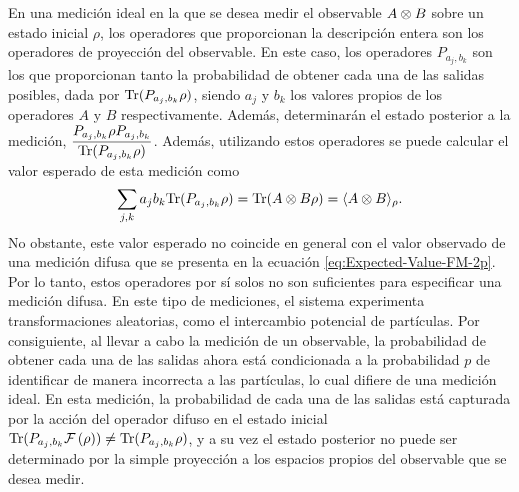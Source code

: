 En una medición ideal en la que se desea medir el observable $A\otimes B$ sobre un estado inicial $\rho$, los operadores que proporcionan la descripción entera son los operadores de proyección del observable. En este caso, los operadores $P_{a_j, b_k}$ son los que proporcionan tanto la probabilidad de obtener cada una de las salidas posibles, dada por ${\rm Tr}(P_{a_j,b_k}\rho )$, siendo $a_j$ y $b_k$ los valores propios de los operadores $A$ y $B$ respectivamente. Además, determinarán el estado posterior a la medición, $\dfrac{P_{a_j,b_k}\rho P_{a_j,b_k}}{{\rm Tr}(P_{a_j,b_k}\rho )}$. Además, utilizando estos operadores se puede calcular el valor esperado de esta medición como \[\sum_{j,k}a_j b_k{\rm Tr}(P_{a_j,b_k}\rho)= {\rm Tr}(A\otimes B \rho)=\langle A\otimes B\rangle_{\rho}.\] No obstante, este valor esperado no coincide en general con el valor observado de una medición difusa que se presenta en la ecuación {\eqref{eq:Expected-Value-FM-2p}}. Por lo tanto, estos operadores por sí solos no son suficientes para especificar una medición difusa. En este tipo de mediciones, el sistema experimenta transformaciones aleatorias, como el intercambio potencial de partículas. Por consiguiente, al llevar a cabo la medición de un observable, la probabilidad de obtener cada una de las salidas ahora está condicionada a la probabilidad $p$ de identificar de manera incorrecta a las partículas, lo cual difiere de una medición ideal. En esta medición, la probabilidad de cada una de las salidas está capturada por la acción del operador difuso en el estado inicial ${\rm Tr}(P_{a_j,b_k}\mathcal{F}\left(\rho\right))\ne{\rm Tr}(P_{a_j,b_k}\rho ) $, y a su vez el estado posterior no puede ser determinado por la simple proyección a los espacios propios del observable que se desea medir.



